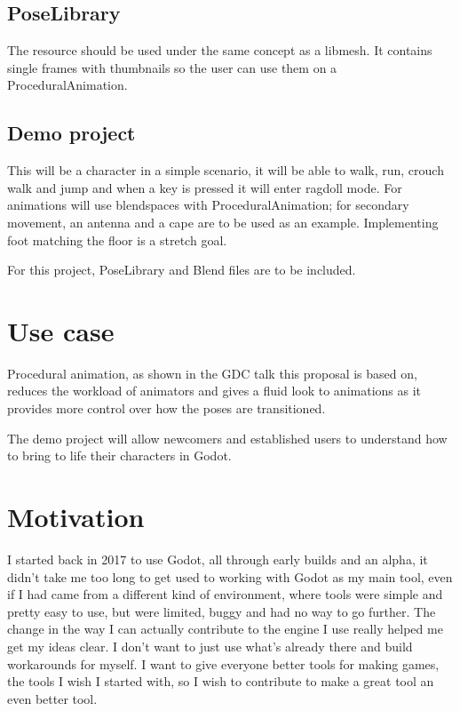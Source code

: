 \documentclass[]{article}
\begin{document}
\subsection{PoseLibrary}
The resource should be used under the same concept as a libmesh. It contains single frames with thumbnails so the user can use them on a ProceduralAnimation.

\subsection{Demo project}
This will be a character in a simple scenario, it will be able to walk, run, crouch walk and jump and when a key is pressed it will enter ragdoll mode.
For animations will use blendspaces with ProceduralAnimation; for secondary movement, an antenna and a cape are to be used as an example. 
Implementing foot matching the floor is a stretch goal. 

For this project, PoseLibrary and Blend files are to be included. 

\section{Use case}

Procedural animation, as shown in the GDC talk this proposal is based on, reduces the workload of animators and gives a fluid look to animations as it provides more control over how the poses are transitioned. 

The demo project will allow newcomers and established users to understand how to bring to life their characters in Godot. 

\section{Motivation}

I started back in 2017 to use Godot, all through early builds and an alpha, it didn’t take me too long to get used to working with Godot as my main tool, even if I had came from a different kind of environment, where tools were simple and pretty easy to use, but were limited, buggy and had no way to go further. The change in the way I can actually contribute to the engine I use really helped me get my ideas clear. I don’t want to just use what’s already there and build workarounds for myself. I want to give everyone better tools for making games, the tools I wish I started with, so I wish to contribute to make a great tool an even better tool. 
\end{document}
